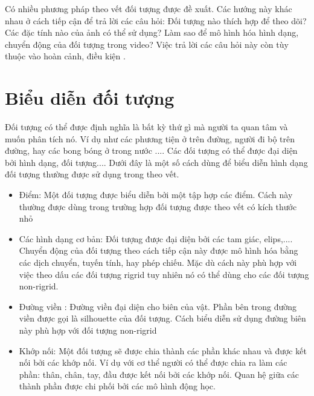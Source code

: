 \documentclass[14pt,oneside,a4paper]{extreport}
\begin{document}
Có nhiều phương pháp theo vết đối tượng được đề xuất. Các hướng này khác nhau ở cách tiếp cận để trả lời các câu hỏi: Đối tượng nào thích hợp để theo dõi? Các đặc tính nào của ảnh có thể sử dụng? Làm sao để mô hình hóa hình dạng, chuyển động của đối tượng trong video? Việc trả lời các câu hỏi này còn tùy thuộc vào hoàn cảnh, điều kiện .
\section{Biểu diễn đối tượng }
Đối tượng có thể được định nghĩa là bất kỳ thứ gì mà người ta quan tâm và muốn phân tích nó. Ví dụ như các phương tiện ở trên đường, người đi bộ trên đường, hay các bong bóng ở trong nước .... Các đối tượng có thể được đại diện bởi hình dạng, đối tượng.... Dưới đây là một số cách dùng để biểu diễn hình dạng đối tượng thường được sử dụng trong  theo vết. 
\begin{itemize}
\item Điểm: Một đối tượng được biểu diễn bởi một tập hợp các điểm. Cách này thường được dùng trong trường hợp đối tượng được theo vết có kích thước nhỏ
\item Các hình dạng cơ bản: Đối tượng được đại diện bởi các tam giác, elips,.... Chuyển động của đối tượng theo cách tiếp cận này được mô hình hóa bằng các dịch chuyển, tuyến tính, hay phép chiếu. Mặc dù cách này phù hợp với việc theo dấu các đối tượng rigrid tuy nhiên nó có thể dùng cho các đối tượng non-rigrid.
\item Đường viền : Đường viền đại diện cho biên của vật. Phần bên trong đường viền được gọi là silhouette của đối tượng. Cách biểu diễn sử dụng đường biên này phù hợp với đối tượng non-rigrid
\item Khớp nối: Một đối tượng sẽ được chia thành các phần khác nhau và được kết nối bởi các khớp nối. Ví dụ với cơ thể người có thể được chia ra làm các phần: thân, chân, tay,  đầu được kết nối bởi các khớp nối. Quan hệ giữa các thành phần được chi phối bởi các mô hình động học.
\end{itemize}
\end{document}
